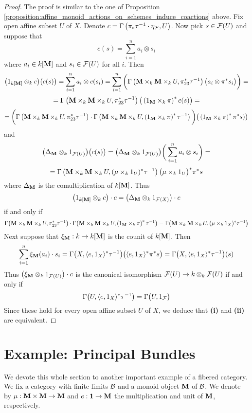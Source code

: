 \begin{proof}
The proof is similar to the one of Proposition \ref{proposition:affine_monoid_actions_on_schemes_induce_coactions} above. Fix open affine subset $U$ of $X$. Denote $c = \Gamma\left(\pi_*\tau^{-1}\cdot \eta_{{\mathcal F}}, U\right)$. Now pick $s\in {\mathcal F}(U)$ and suppose that
$$c(s) = \sum_{i=1}^na_i\otimes s_i$$
where $a_i \in k[\mathbf{M}]$ and $s_i \in {\mathcal F}(U)$ for all $i$. Then
$$\big(1_{k[\mathbf{M}]}\otimes_k c\big)\big(c(s)\big) = \sum_{i=1}^na_i\otimes c(s_i) =  \sum_{i=1}^n\bigg( \Gamma\left(\mathbf{M}\times_k \mathbf{M} \times_kU, \pi_{23}^*\tau^{-1}\right)\big(a_i \otimes \pi^*s_i\big) \bigg) =$$
$$= \Gamma\left(\mathbf{M}\times_k \mathbf{M} \times_kU, \pi_{23}^*\tau^{-1}\right)\big(\left(1_{\mathbf{M}}\times_k \pi\right)^*c(s)\big) =$$
$$= \bigg(\Gamma\left(\mathbf{M}\times_k \mathbf{M} \times_kU, \pi_{23}^*\tau^{-1}\right) \cdot \Gamma\left(\mathbf{M} \times_k \mathbf{M} \times_k U, \left(1_{\mathbf{M}}\times_k \pi\right)^*\tau^{-1}\right)\bigg) \big(\left(1_{\mathbf{M}}\times_k \pi\right)^*\pi^*s)\big)$$
and
$$\big(\Delta_{\mathbf{M}}\otimes_k 1_{{\mathcal F}(U)}\big)\big(c(s)\big) = \big(\Delta_{\mathbf{M}}\otimes_k 1_{{\mathcal F}(U)}\big)\bigg(\sum_{i=1}^na_i\otimes s_i\bigg) =$$
$$=\Gamma\left(\mathbf{M}\times_k\mathbf{M}\times_kU, (\mu\times_k 1_U)^*\tau^{-1}\right)\big(\mu\times_k 1_U\big)^*\pi^*s$$
where $\Delta_{\mathbf{M}}$ is the comultiplication of $k[\mathbf{M}]$. Thus
$$\big(1_{k[\mathbf{M}]}\otimes_k c\big)\cdot c = \big(\Delta_{\mathbf{M}}\otimes_k 1_{{\mathcal F}(X)}\big)\cdot c$$
if and only if 
$$\Gamma\big(\mathbf{M}\times_k\mathbf{M}\times_kU,\pi_{23}^*\tau^{-1}\big) \cdot \Gamma\big(\mathbf{M}\times_k\mathbf{M}\times_kU,\left(1_{\mathbf{M}}\times_k \pi\right)^*\tau^{-1}\big) = \Gamma\big(\mathbf{M}\times_k\mathbf{M}\times_kU,(\mu\times_k 1_X)^*\tau^{-1}\big)$$
Next suppose that $\xi_{\mathbf{M}}:k\rightarrow k[\mathbf{M}]$ is the counit of $k[\mathbf{M}]$. Then
$$\sum_{i=1}^n \xi_{\mathbf{M}}(a_i) \cdot s_i = \Gamma\big(X, \langle e,1_X \rangle^*\tau^{-1}\big)\big(\langle e ,1_X\rangle^*\pi^*s\big) = \Gamma\big(X, \langle e,1_X \rangle^*\tau^{-1}\big)(s)$$
Thus $\big(\xi_{\mathbf{M}} \otimes_k 1_{{\mathcal F}(U)}\big)\cdot c$ is the canonical isomorphism ${\mathcal F}(U)\rightarrow k\otimes_k{\mathcal F}(U)$ if and only if 
$$\Gamma\big(U, \langle e, 1_X\rangle^*\tau^{-1}\big) = \Gamma\big(U,1_{{\mathcal F}}\big)$$
Since these hold for every open affine subset $U$ of $X$, we deduce that \textbf{(i)} and \textbf{(ii)} are equivalent.
\end{proof}

\section{Example: Principal Bundles}
\noindent
We devote this whole section to another important example of a fibered category. We fix a category with finite limits ${\mathcal B}$ and a monoid object $\mathbf{M}$ of ${\mathcal B}$. We denote by $\mu:\mathbf{M}\times \mathbf{M}\rightarrow \mathbf{M}$ and $e:\mathbf{1}\rightarrow \mathbf{M}$ the multiplication and unit of $\mathbf{M}$, respectively.

